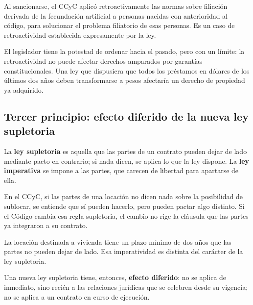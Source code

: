 \documentclass[12pt,oneside]{book}
\begin{document}
\begin{ejemplo}
Al sancionarse, el CCyC aplicó retroactivamente las normas sobre filiación derivada de la fecundación artificial a personas nacidas con anterioridad al código, para solucionar el problema filiatorio de esas personas. Es un caso de retroactividad establecida expresamente por la ley.
\end{ejemplo}

\begin{importante}
El legislador tiene la potestad de ordenar hacia el pasado, pero con un límite: la retroactividad no puede afectar derechos amparados por garantías constitucionales. Una ley que dispusiera que todos los préstamos en dólares de los últimos dos años deben transformarse a pesos afectaría un derecho de propiedad ya adquirido.
\end{importante}

\subsection{Tercer principio: efecto diferido de la nueva ley supletoria}

\begin{definicion}
La \textbf{ley supletoria} es aquella que las partes de un contrato pueden dejar de lado mediante pacto en contrario; si nada dicen, se aplica lo que la ley dispone. La \textbf{ley imperativa} se impone a las partes, que carecen de libertad para apartarse de ella.
\end{definicion}

\begin{ejemplo}[La sublocación]
En el CCyC, si las partes de una locación no dicen nada sobre la posibilidad de sublocar, se entiende que sí pueden hacerlo, pero pueden pactar algo distinto. Si el Código cambia esa regla supletoria, el cambio no rige la cláusula que las partes ya integraron a su contrato.
\end{ejemplo}

\begin{ejemplo}
La locación destinada a vivienda tiene un plazo mínimo de dos años que las partes no pueden dejar de lado. Esa imperatividad es distinta del carácter de la ley supletoria.
\end{ejemplo}

Una nueva ley supletoria tiene, entonces, \textbf{efecto diferido}: no se aplica de inmediato, sino recién a las relaciones jurídicas que se celebren desde su vigencia; no se aplica a un contrato en curso de ejecución.
\end{document}
